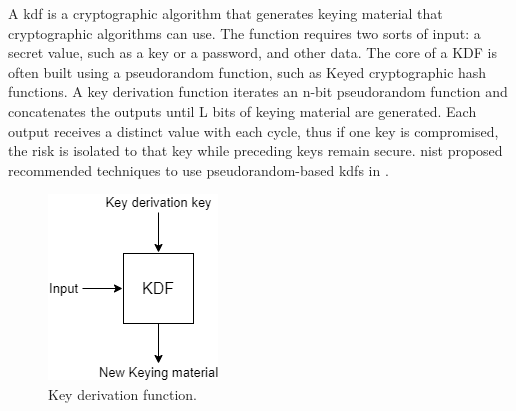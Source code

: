 A \gls{kdf} is a cryptographic algorithm that generates keying material that cryptographic algorithms can use. The function requires two sorts of input: a secret value, such as a key or a password, and other data. The core of a KDF is often built using a pseudorandom function, such as Keyed cryptographic hash functions. A key derivation function iterates an n-bit pseudorandom function and concatenates the outputs until L bits of keying material are generated. Each output receives a distinct value with each cycle, thus if one key is compromised, the risk is isolated to that key while preceding keys remain secure. \gls{nist} proposed recommended techniques to use pseudorandom-based \glspl{kdf} in \cite{chen2008recommendation}. 
\begin{figure}[hptb]
	\centering
	\includegraphics[scale=0.65]{Images/kdf.png}
	\caption{Key derivation function.}
	\label{fig:kdf}
\end{figure}